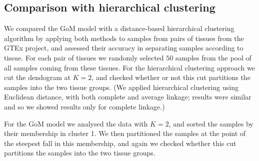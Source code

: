 \documentclass[10pt,letterpaper]{article}
\begin{document}
%


\subsection*{Comparison with hierarchical clustering}

We compared the GoM model with a distance-based hierarchical clustering algorithm by applying both methods to samples from
pairs of tissues from the GTEx project, and assessed their accuracy in
separating samples according to tissue.  For each pair of tissues  we randomly selected $50$ samples from the pool of all samples coming from these tissues.
For the hierarchical clustering approach we cut the dendogram at $K=2$, and checked whether or not this cut partitions the samples into the two tissue groups.
(We applied hierarchical clustering using Euclidean distance, with both complete and average linkage; results were similar and so we showed results only for complete linkage.)

For the GoM model we analysed the data with $K=2$, and sorted the samples by their membership in cluster 1. We then partitioned the samples at the point of the steepest fall in this membership, and again we checked whether this cut partitions the samples into the two tissue groups.
\end{document}
